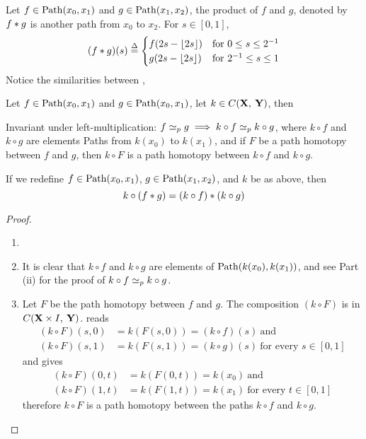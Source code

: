\documentclass[../main-manifolds.tex]{subfiles}
\begin{document}
\begin{definition}\label{munkres:product-of-paths}
    Let $f\in\Path[x_0,x_1]$ and $g\in\Path[x_1,x_2]$, the product of $f$ and $g$, denoted by $f\ast g$ is another path from $x_0$ to $x_2$. For $s\in[0,1]$, 
    \begin{equation}\label{munkres:product-of-paths-equation}
        (f\ast g)(s) \overset{\Delta}{=}\begin{cases}
            f(2s-\lfloor2s\rfloor) & \text{for } 0\leq s\leq 2^{-1}\\
            g(2s-\lfloor2s\rfloor) & \text{for } 2^{-1}\leq s\leq 1\\
        \end{cases}
    \end{equation}
    Notice the similarities between , 
\end{definition}
\begin{wts}
    Let $f\in\Path[x_0,x_1]$ and $g\in\Path[x_0,x_1]$, let $k\in C({\mathbf{X}},\: {\mathbf{Y}})$, then
    \begin{enumroman}
        \item Invariant under left-multiplication: $f\simeq_p g\implies k\circ f\simeq_p k\circ g$, where $k\circ f$ and $k\circ g$ are elements Paths from $k(x_0)$ to $k(x_1)$, and if $F$ be a path homotopy between $f$ and $g$, then $k\circ F$ is a path homotopy between $k\circ f$ and $k\circ g$.
        \item If we redefine $f\in\Path[x_0,x_1]$, $g\in\Path[x_1,x_2]$, and $k$ be as above, then 
        \[
            k\circ(f\ast g)=(k\circ f)\ast(k\circ g)
        \]
    \end{enumroman}
\end{wts}
\begin{proof}
        \begin{enumerate}[label={Proof of Part (\roman*): },leftmargin=*]
        \item[]
        \item It is clear that $k\circ f$ and $k\circ g$ are elements of $\Path[k(x_0),k(x_1)]$, and see Part (ii) for the proof of $k\circ f\simeq_p k\circ g$.
        \item Let $F$ be the path homotopy between $f$ and $g$. The composition $(k\circ F)$ is in $C({\mathbf{X}}\times I,\: {\mathbf{Y}})$.  reads
        \begin{align*}
            (k\circ F)(s,0)&=k(F(s,0))=(k\circ f)(s)\: \text{and}\\ 
            (k\circ F)(s,1)&=k(F(s,1))=(k\circ g)(s)\: \text{for every }s\in[0,1]
        \end{align*}    
        and  gives
        \begin{align*}
            (k\circ F)(0,t)&=k(F(0,t))=k(x_0)\: \text{and}\\
            (k\circ F)(1,t)&=k(F(1,t))=k(x_1)\: \text{for every }t\in[0,1]
        \end{align*}    
        therefore $k\circ F$ is a path homotopy between the paths $k\circ f$ and $k\circ g$.
    \end{enumerate}
\end{proof}
\end{document}
